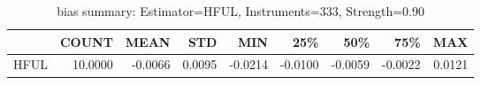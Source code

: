 \begin{table}[ht]
\centering
\caption{bias summary: Estimator=HFUL, Instruments=333, Strength=0.90}
\begin{tabular}{lrrrrrrrr}
\toprule
 & COUNT & MEAN & STD & MIN & 25\% & 50\% & 75\% & MAX \\
\midrule
HFUL & 10.0000 & -0.0066 & 0.0095 & -0.0214 & -0.0100 & -0.0059 & -0.0022 & 0.0121 \\
\bottomrule
\end{tabular}
\end{table}
